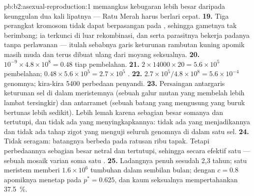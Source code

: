 \begin{solution}{pb:b2:asexual-reproduction:1}
memangkas kebugaran  lebih besar daripada keunggulan dua kali
lipatnya --- Ratu Merah harus berlari cepat.
\textbf{19.} Tiga perangkat kromosom tidak dapat berpasangan pada
, sehingga gametnya tak berimbang; ia terkunci di luar
rekombinasi, dan  serta parasitnya bekerja padanya tanpa
perlawanan --- itulah sebabnya garis keturunan rambutan kuning apomik
masih muda dan terus dibuat ulang dari moyang seksualnya.
\textbf{20.} $10^{-9}\times 4.8\times 10^{8} = 0.48$ tiap pembelahan.
\textbf{21.} $2\times \num{14000}\times 20 = 5.6\times 10^{5}$
pembelahan; $0.48\times 5.6\times 10^{5} = 2.7\times 10^{5}$
.
\textbf{22.} $2.7\times 10^{5}/4.8\times 10^{8} = 5.6\times 10^{-4}$
genomnya; kira-kira \num{5400} perbedaan penyandi.
\textbf{23.} Persaingan antargaris keturunan sel di dalam meristemnya
(sebuah galur mutan yang membelah lebih lambat tersingkir) dan
antarramet (sebuah batang yang mengusung  yang buruk bertunas
lebih sedikit). Lebih lemah karena sebagian besar  somanya
 dan tertutupi, dan tidak ada yang menyingkapkannya: tidak
ada  yang menjadikannya  dan tidak ada tahap zigot
 yang menguji seluruh genomnya di dalam satu sel.
\textbf{24.} Tidak seragam: batangnya berbeda pada ratusan ribu tapak.
Tetapi perbedaannya sebagian besar netral dan tertutupi, sehingga
 secara efektif satu  --- sebuah mosaik varian soma satu
.
\textbf{25.} Ladangnya penuh sesudah 2,3 tahun; satu meristem memberi
$1.6\times 10^{6}$ tumbuhan dalam sembilan bulan; dengan $c = 0.8$
apomiknya menetap pada $p^* = 0.625$, dan kaum seksualnya
mempertahankan \qty{37.5}{\%}.
\end{solution}
